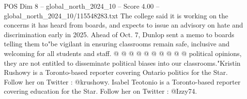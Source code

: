 \begin{textsample}{POS Dim 8 – global\_north\_2024\_10 – Score 4.00 – global\_north\_2024\_10/115548283.txt}
The college said it is working on the concerns it has heard from boards, and expects to issue an advisory on hate and discrimination early in 2025.
Ahead of Oct. 7, Dunlop sent a memo to boards telling them to"be vigilant in ensuring classrooms remain safe, inclusive and welcoming for all students and staff. @ @ @ @ @ @ @ @ @ @ political opinions, they are not entitled to disseminate political biases into our classrooms."Kristin Rushowy is a Toronto-based reporter covering Ontario politics for the Star.
Follow her on Twitter : @krushowy.
Isabel Teotonio is a Toronto-based reporter covering education for the Star.
Follow her on Twitter : @Izzy74.

\end{textsample}
